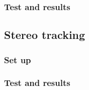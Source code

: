 \subsubsection{Test and results}



\subsection{Stereo tracking}
\subsubsection{Set up}
\subsubsection{Test and results}